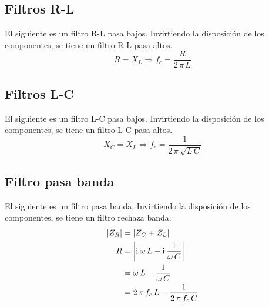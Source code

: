 \documentclass[a5paper,12pt,twoside]{book}
\begin{document}
\subsection*{Filtros R-L}

El siguiente es un filtro R-L pasa bajos. Invirtiendo la disposición de los componentes, se tiene un filtro R-L pasa altos.
\begin{equation*}
    R = X_L \Rightarrow f_c = \frac{R}{2 \, \pi \, L}
\end{equation*}

\begin{center}
    \def\svgwidth{0.6\linewidth}
    
\end{center}


\subsection*{Filtros L-C}

El siguiente es un filtro L-C pasa bajos. Invirtiendo la disposición de los componentes, se tiene un filtro L-C pasa altos.
\begin{equation*}
    X_C = X_L \Rightarrow f_c = \dfrac{1}{2 \, \pi \, \sqrt{L \, C}}
\end{equation*}

\begin{center}
    \def\svgwidth{0.6\linewidth}
    
\end{center}


\subsection*{Filtro pasa banda}

El siguiente es un filtro pasa banda. Invirtiendo la disposición de los componentes, se tiene un filtro rechaza banda.
\begin{align*}
    {\left| {Z_R} \right|} &= {\left| {Z_C + Z_L} \right|}
    \\
    R &= {\left| {\mathrm{i}\mkern1mu \, \omega \, L - \mathrm{i}\mkern1mu \, \frac{1}{\omega \, C}} \right|}
    \\
    &= \omega \, L - \frac{1}{\omega \, C}
    \\
    &= 2 \, \pi \, f_c \, L - \frac{1}{2 \, \pi \, f_c \, C}
\end{align*}

\begin{center}
    \def\svgwidth{0.6\linewidth}
    
\end{center}
\end{document}
